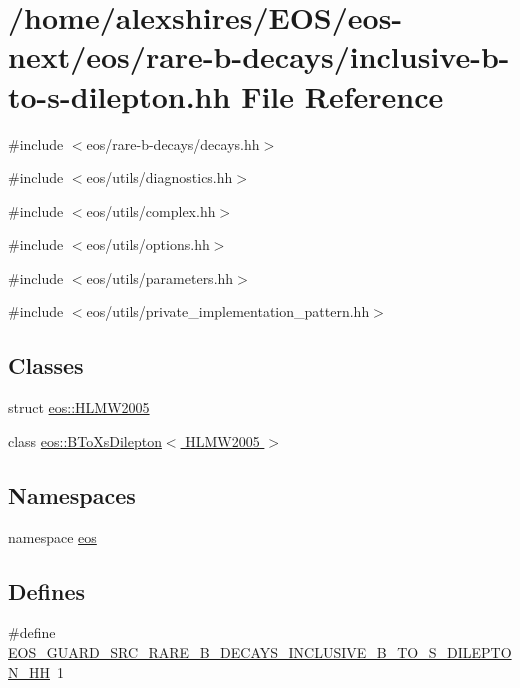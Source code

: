 \hypertarget{inclusive-b-to-s-dilepton_8hh}{
\section{/home/alexshires/EOS/eos-\/next/eos/rare-\/b-\/decays/inclusive-\/b-\/to-\/s-\/dilepton.hh File Reference}
\label{inclusive-b-to-s-dilepton_8hh}
}
{\ttfamily \#include $<$eos/rare-\/b-\/decays/decays.hh$>$}\par
{\ttfamily \#include $<$eos/utils/diagnostics.hh$>$}\par
{\ttfamily \#include $<$eos/utils/complex.hh$>$}\par
{\ttfamily \#include $<$eos/utils/options.hh$>$}\par
{\ttfamily \#include $<$eos/utils/parameters.hh$>$}\par
{\ttfamily \#include $<$eos/utils/private\_\-implementation\_\-pattern.hh$>$}\par
\subsection*{Classes}
\begin{DoxyCompactItemize}
\item 
struct \hyperlink{structeos_1_1HLMW2005}{eos::HLMW2005}
\item 
class \hyperlink{classeos_1_1BToXsDilepton_3_01HLMW2005_01_4}{eos::BToXsDilepton$<$ HLMW2005 $>$}
\end{DoxyCompactItemize}
\subsection*{Namespaces}
\begin{DoxyCompactItemize}
\item 
namespace \hyperlink{namespaceeos}{eos}
\end{DoxyCompactItemize}
\subsection*{Defines}
\begin{DoxyCompactItemize}
\item 
\#define \hyperlink{inclusive-b-to-s-dilepton_8hh_a290a6121689c083f2538e84219aea5c1}{EOS\_\-GUARD\_\-SRC\_\-RARE\_\-B\_\-DECAYS\_\-INCLUSIVE\_\-B\_\-TO\_\-S\_\-DILEPTON\_\-HH}~1
\end{DoxyCompactItemize}


